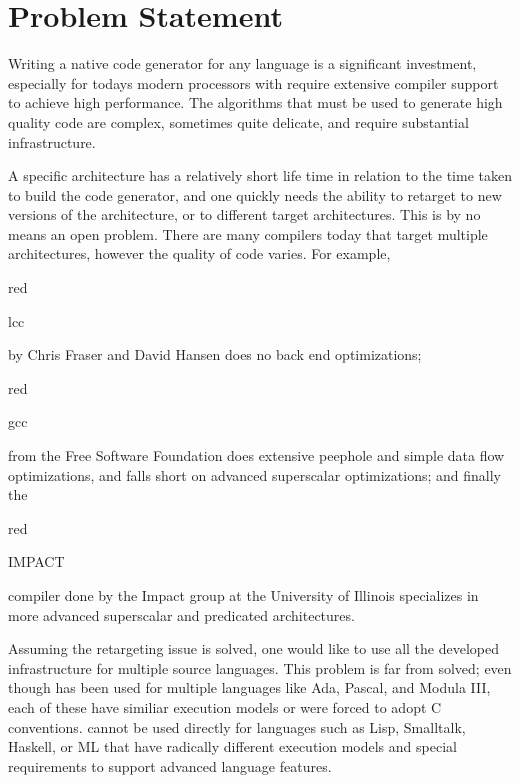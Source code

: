 \section{Problem Statement}

    Writing a native code generator for any language is a significant
    investment, especially for todays modern processors with require extensive
    compiler support to achieve high performance.  The algorithms that must
    be used to generate high quality code are complex, sometimes quite
    delicate, and require substantial infrastructure.

    A specific architecture has a
    relatively short life time in relation to the time taken to build
    the code generator, and one quickly needs the ability to retarget
    to new versions of the architecture, or to different target
    architectures. This is by no means an open problem. There are many
    compilers today that target multiple architectures, however the
    quality of code varies. For example, 
    \begin{color}{red}\begin{Italics}lcc\end{Italics}\end{color} 
    by Chris Fraser and David Hansen does
    no back end optimizations; 
    \begin{color}{red}\begin{Italics}gcc\end{Italics}\end{color} 
    from the Free Software Foundation does extensive peephole and simple
    data flow optimizations, and falls short on advanced superscalar
    optimizations; and finally the 
    \begin{color}{red}\begin{Italics}IMPACT\end{Italics}\end{color} 
    compiler done by the Impact group at the
    University of Illinois specializes in more advanced superscalar
    and predicated architectures. 

    
     Assuming
    the retargeting issue is solved, one would like to use all the
    developed infrastructure for multiple source languages. This
    problem is far from solved; even though  has been used
    for multiple languages like Ada, Pascal, and Modula III, each of
    these have similiar execution models or were forced to adopt C
    conventions.   cannot be used directly for languages
    such as Lisp, Smalltalk, Haskell, or ML that have radically
    different execution models and special requirements to support
    advanced language features.
 
   

